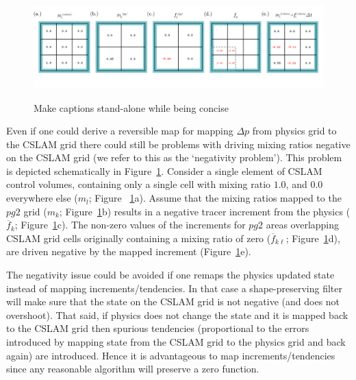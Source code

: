 \begin{figure}[t]
\begin{center}
\noindent\includegraphics[width=30pc,angle=0]{figs/alg-schematic.png}\\
\end{center}
\caption{Make captions stand-alone while being concise}
\label{fig:alg-schematic}
\end{figure}

Even if one could derive a reversible map for mapping $\Delta p$ from physics grid to the CSLAM grid there could still be problems with driving mixing ratios negative on the CSLAM grid (we refer to this as the `negativity problem'). This problem is depicted schematically in Figure~\ref{fig:alg-schematic}. Consider a single element of CSLAM control volumes, containing only a single cell with mixing ratio $1.0$, and $0.0$ everywhere else ($m_l$; Figure ~\ref{fig:alg-schematic}a). Assume that the mixing ratios mapped to the $pg2$ grid ($m_k$; Figure~\ref{fig:alg-schematic}b) results in a negative tracer increment from the physics ($\overline{f}_k$; Figure~\ref{fig:alg-schematic}c). The non-zero values of the increments for $pg2$ areas overlapping CSLAM grid cells originally containing a mixing ratio of zero ($\overline{f}_{k\ell}$; Figure~\ref{fig:alg-schematic}d), are driven negative by the mapped increment (Figure~\ref{fig:alg-schematic}e). 

The negativity issue could be avoided if one remaps the physics updated state instead of mapping increments/tendencies. In that case a shape-preserving filter will make sure that the state on the CSLAM grid is not negative (and does not overshoot). That said, if physics does not change the state and it is mapped back to the CSLAM grid then spurious tendencies (proportional to the errors introduced by mapping state from the CSLAM grid to the physics grid and back again) are introduced. Hence it is advantageous to map increments/tendencies since any reasonable algorithm will preserve a zero function.

